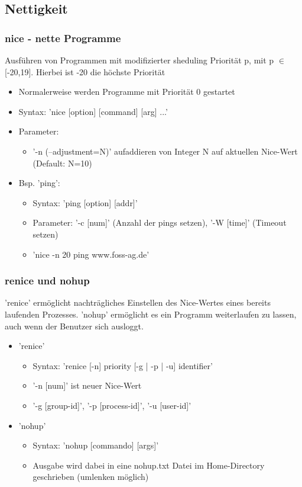 \documentclass[12pt,utf8]{beamer}
\begin{document}
\subsection{Nettigkeit}
\begin{frame}
\frametitle{nice - nette Programme}
Ausführen von Programmen mit modifizierter sheduling Priorität p, mit p $\in$ [-20,19]. Hierbei ist -20 die höchste Priorität
\begin{itemize}[<+->]
	\item Normalerweise werden Programme mit Priorität 0 gestartet
	\item Syntax: 'nice [option] [command] [arg] ...'
	\item Parameter:
	\begin{itemize}
		\item '-n (--adjustment=N)' aufaddieren von Integer N auf aktuellen Nice-Wert (Default: N=10)
	\end{itemize}
	\item Bsp. 'ping':
	\begin{itemize}[<+->]
		\item Syntax: 'ping [option] [addr]'
		\item Parameter: '-c [num]' (Anzahl der pings setzen), '-W [time]' (Timeout setzen)
		\item 'nice -n 20 ping www.foss-ag.de'
	\end{itemize}
\end{itemize}
\end{frame}

\begin{frame}
\frametitle{renice und nohup}
'renice' ermöglicht nachträgliches Einstellen des Nice-Wertes eines bereits laufenden Prozesses.
'nohup' ermöglicht es ein Programm weiterlaufen zu lassen, auch wenn der Benutzer sich ausloggt.
\begin{itemize}
	\item 'renice'
	\begin{itemize}[<+->]
		\item Syntax: 'renice [-n] priority [-g | -p | -u] identifier'
		\item '-n [num]' ist neuer Nice-Wert
		\item '-g [group-id]', '-p [process-id]', '-u [user-id]'
	\end{itemize}
	\item 'nohup'
	\begin{itemize}
		\item Syntax: 'nohup [commando] [args]'
		\item Ausgabe wird dabei in eine nohup.txt Datei im Home-Directory geschrieben (umlenken möglich)
	\end{itemize}
\end{itemize}
\end{frame}
\end{document}
